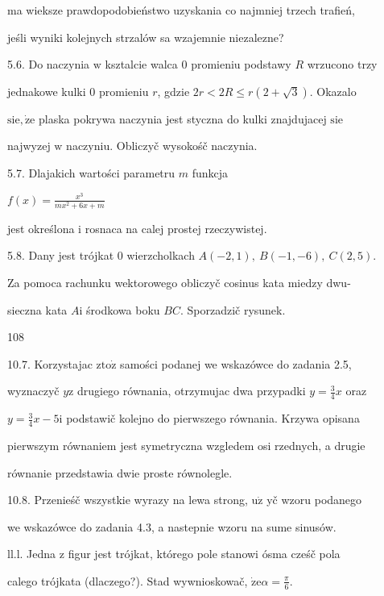 \documentclass[a4paper,12pt]{article}
\begin{document}
ma wieksze prawdopodobieństwo uzyskania co najmniej trzech trafień,

jeśli wyniki kolejnych strzalów sa wzajemnie niezalezne?

5.6. Do naczynia $\mathrm{w}$ ksztalcie walca $0$ promieniu podstawy $R$ wrzucono trzy

jednakowe kulki $0$ promieniu $r$, gdzie $2r<2R\leq r(2+\sqrt{3})$. Okazalo

$\mathrm{s}\mathrm{i}\mathrm{e}, \dot{\mathrm{z}}\mathrm{e}$ plaska pokrywa naczynia jest styczna do kulki znajdujacej $\mathrm{s}\mathrm{i}\mathrm{e}$

najwyzej $\mathrm{w}$ naczyniu. Obliczyč wysokośč naczynia.

5.7. Dlajakich wartości parametru $m$ funkcja

$f(x)=\displaystyle \frac{x^{3}}{mx^{2}+6x+m}$

jest określona $\mathrm{i}$ rosnaca na calej prostej rzeczywistej.

5.8. Dany jest trójkat $0$ wierzcholkach $A(-2,1),\ B(-1,-6),\ C(2,5)$.

Za pomoca rachunku wektorowego obliczyč cosinus kata miedzy dwu-

sieczna kata $A\mathrm{i}$ środkowa boku $BC$. Sporzadzič rysunek.





108

10.7. Korzystajac $\mathrm{z}\mathrm{t}\mathrm{o}\dot{\mathrm{z}}$ samości podanej we wskazówce do zadania 2.5,

wyznaczyč $y\mathrm{z}$ drugiego równania, otrzymujac dwa przypadki $y=\displaystyle \frac{3}{4}x$ oraz

$y= \displaystyle \frac{3}{4}x-5\mathrm{i}$ podstawič kolejno do pierwszego równania. Krzywa opisana

pierwszym równaniem jest symetryczna wzgledem osi rzednych, a drugie

równanie przedstawia dwie proste równolegle.

10.8. Przenieśč wszystkie wyrazy na lewa strong, $\mathrm{u}\dot{\mathrm{z}}$ yč wzoru podanego

we wskazówce do zadania 4.3, a nastepnie wzoru na sume sinusów.

ll.l. Jedna $\mathrm{z}$ figur jest trójkat, którego pole stanowi ósma cześč pola

calego trójkata (dlaczego?). Stad wywnioskowač, $\displaystyle \dot{\mathrm{z}}\mathrm{e}\alpha=\frac{\pi}{6}.$
\end{document}

